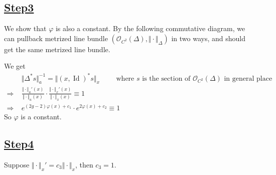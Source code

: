 \documentclass[reqno,11pt]{amsart}
\numberwithin{equation}{section}
\theoremstyle{plain}
\theoremstyle{plain}
\numberwithin{equation}{section}
\theoremstyle{remark}
\DeclareMathOperator{\Id}{\operatorname{Id}}
\newcommand{\norm}[1]{\Vert{#1}\Vert}
\begin{document}
\subsection*{\underline{Step3}}
We show that $\varphi$ is also a constant. By the following commutative diagram, we can pullback metrized line bundle $(\mathcal{O}_{C^2}(\Delta), \norm{\cdot}_{\Delta})$ in two ways, and should get the same metrized line bundle.
\begin{center}
\end{center}
We get
\begin{equation*}
\begin{aligned}
& \norm{\Delta^* s}_a^{-1}=\norm{(x,\Id)^* s}_x \qquad \text{ where $s$ is the section of $\mathcal{O}_{C^2}(\Delta)$ in general place}\\
  \Longrightarrow\;& \frac{\norm{\cdot}_a'(x)}{\norm{\cdot}_a(x)}\cdot \frac{\norm{\cdot}_x'(x)}{\norm{\cdot}_x(x)} \equiv 1\\ 
  \Longrightarrow\;&
  e^{(2g-2)\varphi(x)+c_1} \cdot e^{2\varphi(x)+c_2} \equiv 1
\end{aligned}
\end{equation*}
So $\varphi$ is a constant.
\subsection*{\underline{Step4}}
Suppose $\norm{\cdot}_x'=c_3\norm{\cdot}_x$, then $c_3=1$.
\end{document}
